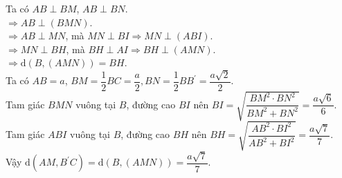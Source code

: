 \begin{ex}
{\begin{center}
		\end{center}
		Ta có $A B \perp B M$, $A  B \perp B N$.\\
		$\Rightarrow  A B \perp(B M N)$.\\
		$\Rightarrow A B \perp M N$, mà $M N \perp  B I \Rightarrow M N \perp(A B I)$.\\
		$\Rightarrow M N \perp B H$, mà $B H \perp A  I \Rightarrow B H \perp(A M N)$.\\
		$\Rightarrow \mathrm{d}(B,(A M  N))=B H$.\\
		Ta có $A  B=a$, $B M=\dfrac{1}{2} B C=\dfrac{a}{2}, B N=\dfrac{1}{2} B B^{\prime}=\dfrac{a \sqrt{2}}{2}$.\\
		Tam giác $B M N$ vuông tại $B$, đường cao  $B I$ nên $B I=\sqrt{\dfrac{B M^{2} \cdot B N^{2}}{B M^{2}+B N^{2}}}=\dfrac{a \sqrt{6}}{6}$.\\
		Tam giác $A B  I$ vuông tại $B$, đường cao $B H$ nên $B H=\sqrt{\dfrac{A B^{2} \cdot B I^{2}}{A B^{2}+B I^{2}}}=\dfrac{a \sqrt{7}}{7}$.\\
	Vậy  $\mathrm{d}\left(A M, B^{\prime} C\right)=\mathrm{d}(B,(A M N))=\dfrac{a \sqrt{7}}{7}$.}
\end{ex}

